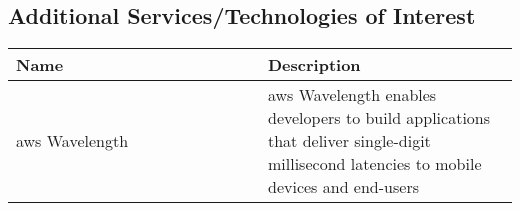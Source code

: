 \subsection{Additional Services/Technologies of Interest}
\begin{center}
\begin{tabular}{ | p{0.5\linewidth} | p{0.5\linewidth} | } 
 \hline
 \textbf{Name} & \textbf{Description}\\ 
\hline
\acrshort{aws} Wavelength & \acrshort{aws} Wavelength enables developers to build applications that deliver single-digit millisecond latencies to mobile devices and end-users \parencite{awswavelength} \\
\hline

\hline 
\end{tabular}
\end{center}
